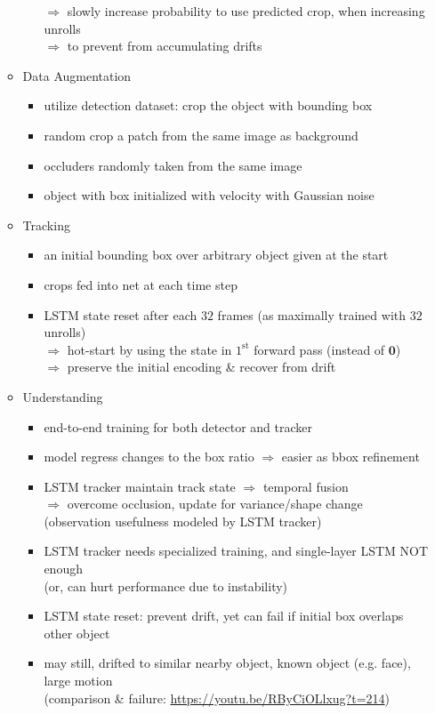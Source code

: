 \begin{itemize}
\begin{itemize}
\begin{itemize}
		$\Rightarrow$ slowly increase probability to use predicted crop, when increasing unrolls \\
		$\Rightarrow$ to prevent from accumulating drifts
		\end{itemize}
	\item Data Augmentation
		\begin{itemize}
		\item utilize detection dataset: crop the object with bounding box
		\item random crop a patch from the same image as background
		\item occluders randomly taken from the same image
		\item object with box initialized with velocity with Gaussian noise
		\end{itemize}
	\item Tracking
		\begin{itemize}
		\item an initial bounding box over arbitrary object given at the start
		\item crops fed into net at each time step
		\item LSTM state reset after each $32$ frames (as maximally trained with $32$ unrolls) \\
		$\Rightarrow$ hot-start by using the state in $1^\text{st}$ forward pass (instead of $\mathbf 0$) \\
		$\Rightarrow$ preserve the initial encoding \& recover from drift
		\end{itemize}
	\item Understanding
		\begin{itemize}
		\item end-to-end training for both detector and tracker
		\item model regress changes to the box ratio $\Rightarrow$ easier as bbox refinement
		\item LSTM tracker maintain track state $\Rightarrow$ temporal fusion \\
		$\Rightarrow$ overcome occlusion, update for variance/shape change \\
		(observation usefulness modeled by LSTM tracker)
		\item LSTM tracker needs specialized training, and single-layer LSTM NOT enough \\
		(or, can hurt performance due to instability)
		\item LSTM state reset: prevent drift, yet can fail if initial box overlaps other object
		\item may still, drifted to similar nearby object, known object (e.g. face), large motion \\
		(comparison \& failure: \url{https://youtu.be/RByCiOLlxug?t=214})
		\end{itemize}
	\end{itemize}


\end{itemize}
